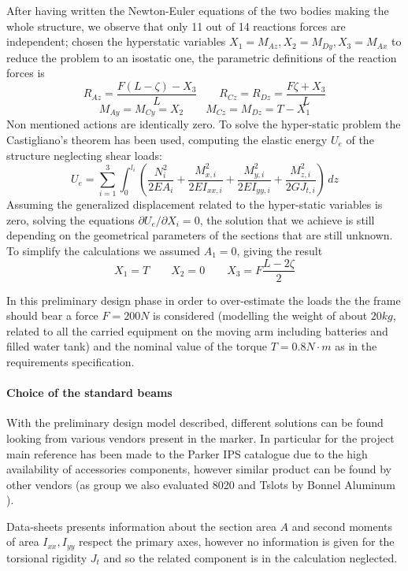 	After having written the Newton-Euler equations of the two bodies making the whole structure, we observe that only 11 out of 14 reactions forces are independent; chosen the hyperstatic variables $X_1 = M_{Az},X_2 = M_{Dy}, X_3 = M_{Ax}$ to reduce the problem to an isostatic one, the parametric definitions of the reaction forces is
	\[ R_{Az} = \frac{F (L-\zeta) - X_3}{L} \qquad R_{Cz} = R_{Dz} =\frac{F\zeta + X_3}{L} \] \[ M_{Ay} = M_{Cy} = X_2 \qquad M_{Cz} = M_{Dz} = T-X_1 \]
	Non mentioned actions are identically zero. To solve the hyper-static problem the Castigliano's theorem has been used, computing the elastic energy $U_e$ of the structure neglecting shear loads:
	\[ U_e = \sum_{i=1}^3 \int_0 ^{l_i}  \left( \frac{N_i^2}{2EA_i} + \frac{M_{x,i}^2}{2 EI_{xx,i}} + \frac{M_{y,i}^2}{2 E I_{yy,i}} + \frac{M_{z,i}^2}{2G J_{t,i}}  \right)\, dz \]
	Assuming the generalized displacement related to the hyper-static variables is zero, solving the equations $\partial U_e / \partial X_i = 0$, the solution that we achieve is still depending on the geometrical parameters of the sections that are still unknown. To simplify the calculations we assumed $A_1 = 0$, giving the result
	\[ X_1 = T \qquad X_2 = 0 \qquad X_3 = F \frac{L-2\zeta}{2} \]
	
	
	In this preliminary design phase in order to over-estimate the loads the the frame should bear a force $F = 200 N$ is considered (modelling the weight of about $20kg$, related to all the carried equipment on the moving arm including batteries and filled water tank) and the nominal value of the torque $T = 0.8 N\cdot m$ as in the requirements specification.
	
	\paragraph{Choice of the standard beams} With the preliminary design model described, different solutions can be found looking from various vendors present in the marker. In particular for the project main reference has been made to the Parker IPS catalogue \cite{parker-ds} due to the high availability of accessories components, however similar product can be found by other vendors (as group we also evaluated 8020 \cite{8020-ds} and Tslots by Bonnel Aluminum \cite{tslot-ds}).
	
	Data-sheets presents information about the section area $A$ and second moments of area $I_{xx},I_{yy}$ respect the primary axes, however no information is given for the torsional rigidity $J_t$ and so the related component is in the calculation neglected. 
	
